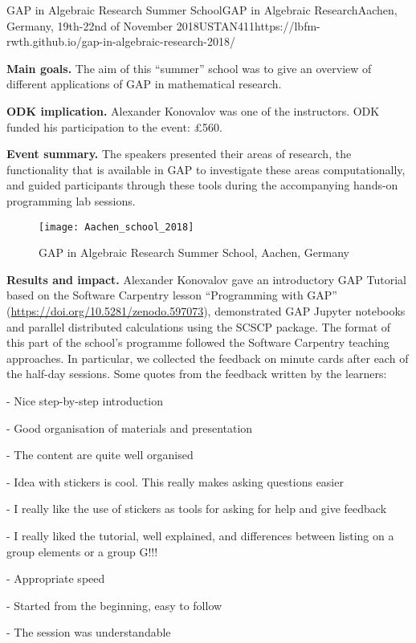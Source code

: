 \begin{event}{GAP in Algebraic Research Summer School}{GAP in Algebraic Research}{Aachen, Germany, 19th-22nd of November 2018}{USTAN}{41}{1}{https://lbfm-rwth.github.io/gap-in-algebraic-research-2018/}

\textbf{Main goals.} The aim of this ``summer'' school was 
to give an overview of different applications of GAP in mathematical research. 

\textbf{ODK implication.} Alexander Konovalov was one of the instructors. 
ODK funded his participation to the event: \pounds 560.

\textbf{Event summary.} The speakers presented their areas of research, 
the functionality that is available in GAP to investigate these areas 
computationally, and guided participants through these tools during the 
accompanying hands-on programming lab sessions.

\begin{figure}[ht]
  \texttt{[image: Aachen\_school\_2018]}
  \caption*{GAP in Algebraic Research Summer School, Aachen, Germany}
\end{figure}

\textbf{Results and impact.} Alexander Konovalov
gave an introductory GAP Tutorial based on the 
Software Carpentry lesson ``Programming with GAP''
(\url{https://doi.org/10.5281/zenodo.597073}),
demonstrated GAP Jupyter notebooks and parallel 
distributed calculations using the SCSCP package.
The format of this part of the school's programme
followed the Software Carpentry teaching approaches.
In particular, we collected the feedback on minute
cards after each of the half-day sessions. Some quotes
from the feedback written by the learners:

- Nice step-by-step introduction

- Good organisation of materials and presentation

- The content are quite well organised 

- Idea with stickers is cool. This really makes asking questions easier

- I really like the use of stickers as tools for asking for help and give feedback

- I really liked the tutorial, well explained, and differences between listing on a group elements or a group G!!!

- Appropriate speed

- Started from the beginning, easy to follow

- The session was understandable


\end{event}
